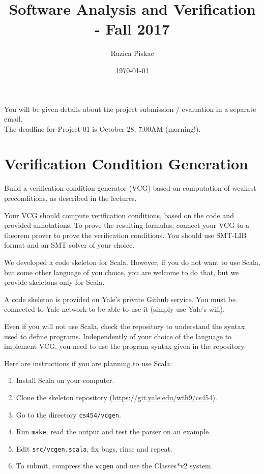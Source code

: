 \documentclass[11pt]{article}
\title{Software Analysis and Verification - Fall 2017}
\author{Ruzica Piskac}%
\date{\today}
\begin{document}
\maketitle

You will be given details about the project submission / evaluation in a separate email.\\

The deadline for Project 01 is October 28, 7:00AM (morning!).

\section{Verification Condition Generation}

Build a verification condition generator (VCG) based on computation of weakest
preconditions, as described in the lectures.

Your VCG should compute verification conditions, based on the code and
provided annotations. To prove the resulting formulas, connect your VCG to a
theorem prover to prove the verification conditions. You should use SMT-LIB
format and an SMT solver of your choice.


We developed a code skeleton for Scala. However, if you do not want to use Scala, but some other language of you choice, you are welcome to do that, but we provide skeletons only for Scala. 

A code skeleton is provided on Yale's private Github service.  You must be
connected to Yale network to be able to use it (simply use Yale's wifi).

Even if you will not use Scala, check the repository to understand the syntax used to define programs. Independently of your choice of the language to implement VCG,
 you need to use the program syntax given in the repository.

Here are instructions if you are planning to use Scala:
\begin{enumerate}
\item Install Scala on your computer.
\item Clone the skeleton repository (\url{https://git.yale.edu/wth9/cs454}).
\item Go to the directory \texttt{cs454/vcgen}.
\item Run \texttt{make}, read the output and test the parser on an example.
\item Edit \texttt{src/vcgen.scala}, fix bugs, rinse and repeat.
\item To submit, compress the \texttt{vcgen} and use the Classes*v2 system.
\end{enumerate}
\end{document}
